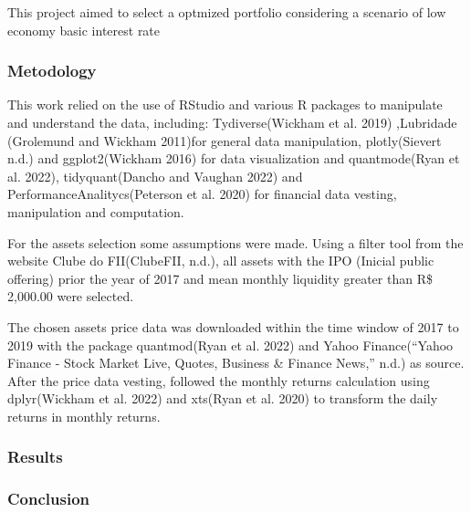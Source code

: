 \documentclass[
  letterpaper,
  DIV=11,
  numbers=noendperiod]{scrartcl}
\begin{document}
This project aimed to select a optmized portfolio considering a scenario
of low economy basic interest rate

\hypertarget{metodology}{%
\subsubsection{Metodology}\label{metodology}}

This work relied on the use of RStudio and various R packages to
manipulate and understand the data, including: Tydiverse(Wickham et al.
2019) ,Lubridade (Grolemund and Wickham 2011)for general data
manipulation, plotly(Sievert n.d.) and ggplot2(Wickham 2016) for data
visualization and quantmode(Ryan et al. 2022), tidyquant(Dancho and
Vaughan 2022) and PerformanceAnalitycs(Peterson et al. 2020) for
financial data vesting, manipulation and computation.

For the assets selection some assumptions were made. Using a filter tool
from the website Clube do FII(ClubeFII, n.d.), all assets with the IPO
(Inicial public offering) prior the year of 2017 and mean monthly
liquidity greater than R\$ 2,000.00 were selected.

The chosen assets price data was downloaded within the time window of
2017 to 2019 with the package quantmod(Ryan et al. 2022) and Yahoo
Finance({``Yahoo Finance - Stock Market Live, Quotes, Business \&
Finance News,''} n.d.) as source. After the price data vesting, followed
the monthly returns calculation using dplyr(Wickham et al. 2022) and
xts(Ryan et al. 2020) to transform the daily returns in monthly returns.

\hypertarget{results}{%
\subsubsection{Results}\label{results}}

\hypertarget{conclusion}{%
\subsubsection*{Conclusion}\label{conclusion}}
\end{document}
